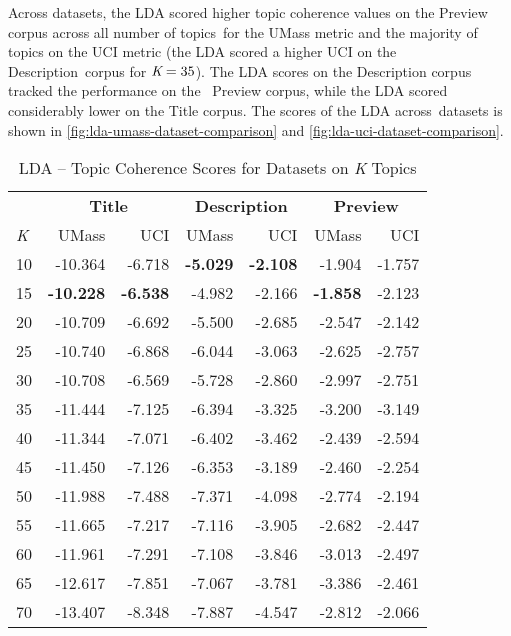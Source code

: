 \documentclass[letterpaper,12pt]{article}
\begin{document}
Across datasets, the LDA scored higher topic coherence values on the Preview corpus across all number of topics\
for the UMass metric and the majority of topics on the UCI metric (the LDA scored a higher UCI on the Description\
corpus for $\emph{K} = 35$). The LDA scores on the Description corpus tracked the performance on the \
Preview corpus, while the LDA scored considerably lower on the Title corpus. The scores of the LDA across\
datasets is shown in \ref{fig:lda-umass-dataset-comparison} and \ref{fig:lda-uci-dataset-comparison}.
\begin{table}
	\caption{\label{tab:lda_data_comp} LDA -- Topic Coherence Scores for Datasets on \emph{K} Topics}
	\begin{center}
		\begin{tabular}{| l | rr | rr | rr |}
			\hline
			{} & \multicolumn{2}{c|}{\textbf{Title}} & \multicolumn{2}{c|}{\textbf{Description}} & \multicolumn{2}{c|}{\textbf{Preview}} \\
			\emph{K} &       UMass &    UCI &  UMass &    UCI &   UMass &    UCI \\
			\hline
				10  & -10.364 & -6.718 &      \textbf{-5.029} & \textbf{-2.108} &  -1.904 & -1.757 \\
				15  & \textbf{-10.228} & \textbf{-6.538} &      -4.982 & -2.166 &  \textbf{-1.858} & -2.123 \\
				20  & -10.709 & -6.692 &      -5.500 & -2.685 &  -2.547 & -2.142 \\
				25  & -10.740 & -6.868 &      -6.044 & -3.063 &  -2.625 & -2.757 \\
				30  & -10.708 & -6.569 &      -5.728 & -2.860 &  -2.997 & -2.751 \\
				35  & -11.444 & -7.125 &      -6.394 & -3.325 &  -3.200 & -3.149 \\
				40  & -11.344 & -7.071 &      -6.402 & -3.462 &  -2.439 & -2.594 \\
				45  & -11.450 & -7.126 &      -6.353 & -3.189 &  -2.460 & -2.254 \\
				50  & -11.988 & -7.488 &      -7.371 & -4.098 &  -2.774 & -2.194 \\
				55  & -11.665 & -7.217 &      -7.116 & -3.905 &  -2.682 & -2.447 \\
				60  & -11.961 & -7.291 &      -7.108 & -3.846 &  -3.013 & -2.497 \\
				65  & -12.617 & -7.851 &      -7.067 & -3.781 &  -3.386 & -2.461 \\
				70  & -13.407 & -8.348 &      -7.887 & -4.547 &  -2.812 & -2.066 \\

\end{tabular}
\end{center}
\end{table}
\end{document}

